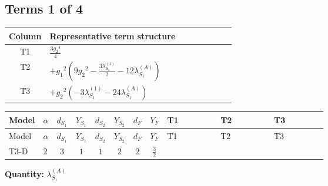 \documentclass[8pt]{article}
\begin{document}
\begin{landscape}
\subsection*{Terms 1 of 4}
\begin{center}
\begin{tabular}{@{}c >{\raggedright\arraybackslash}p{0.82\linewidth}@{}}
\toprule
Column & Representative term structure \\
\midrule
T1 & \(\displaystyle \frac{3 {g_2}^4}{4}\) \\
\midrule
T2 & \(\displaystyle +{g_1}^2 \left(9 {g_2}^2-\frac{3 {\lambda_{S_1}^{(1)}}}{2}-12 {\lambda_{S_1}^{(A)}}\right)\) \\
\midrule
T3 & \(\displaystyle +{g_2}^2 (-3 {\lambda_{S_1}^{(1)}}-24 {\lambda_{S_1}^{(A)}})\) \\
\midrule
\bottomrule
\end{tabular}
\end{center}
\smallskip
\tiny
\begin{longtable}{@{}llcccccc >{\raggedright\arraybackslash}p{0.21\linewidth} >{\raggedright\arraybackslash}p{0.21\linewidth} >{\raggedright\arraybackslash}p{0.21\linewidth}@{}}
\toprule
Model & $\alpha$ & $d_{S_1}$ & $Y_{S_1}$ & $d_{S_2}$ & $Y_{S_2}$ & $d_F$ & $Y_F$ & T1 & T2 & T3 \\
\midrule
\endfirsthead
\toprule
Model & $\alpha$ & $d_{S_1}$ & $Y_{S_1}$ & $d_{S_2}$ & $Y_{S_2}$ & $d_F$ & $Y_F$ & T1 & T2 & T3 \\
\midrule
\endhead
T3-D & $2$ & $3$ & $1$ & $1$ & $2$ & $2$ & $\frac{3}{2}$ & \scriptsize\adjustbox{max width=\linewidth}{$\begin{gathered} \frac{3 {g_2}^4}{4}\end{gathered}$} & \scriptsize\adjustbox{max width=\linewidth}{$\begin{gathered} +{g_1}^2 \left(9 {g_2}^2-\frac{3 {\lambda_{S_1}^{(1)}}}{2}-12 {\lambda_{S_1}^{(A)}}\right)\end{gathered}$} & \scriptsize\adjustbox{max width=\linewidth}{$\begin{gathered} +{g_2}^2 (-3 {\lambda_{S_1}^{(1)}}-24 {\lambda_{S_1}^{(A)}})\end{gathered}$} \\
\midrule
\bottomrule
\end{longtable}
\clearpage
\noindent\textbf{Quantity: }$\lambda_{S_1}^{(A)}$\par\smallskip

\end{landscape}
\end{document}
